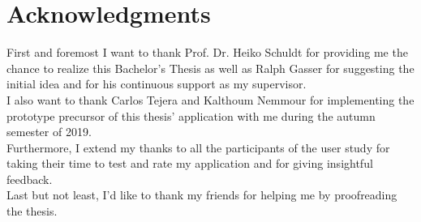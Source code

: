 \chapter{Acknowledgments}


First and foremost I want to thank Prof. Dr. Heiko Schuldt for providing me the chance to realize this Bachelor's Thesis as well as Ralph Gasser for suggesting the initial idea and for his continuous support as my supervisor.\\
I also want to thank Carlos Tejera and Kalthoum Nemmour for implementing the prototype precursor of this thesis' application with me during the autumn semester of 2019.\\
Furthermore, I extend my thanks to all the participants of the user study for taking their time to test and rate my application and for giving insightful feedback.\\
Last but not least, I'd like to thank my friends for helping me by proofreading the thesis.